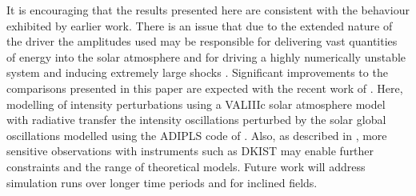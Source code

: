 \documentclass[physics,article,submit,pdftex,moreauthors]{Definitions/mdpi}
\begin{document}
It is encouraging that the results presented here are consistent with the behaviour exhibited  by earlier work. There is an issue that due to the extended nature of the driver the amplitudes used may be responsible for delivering vast quantities of energy into the solar atmosphere and for driving a highly numerically unstable system and inducing extremely large shocks \citet{Santamaria2015}. Significant improvements to the comparisons presented in this paper are expected with the  recent work of \citet{Kostogryz2021}. Here, modelling of intensity perturbations using a VALIIIc solar atmosphere model with radiative transfer the intensity oscillations perturbed by the solar global oscillations modelled using the ADIPLS code of \citet{Christensen-Dalsgaard2008}. Also, as described in \citet{Rast2016}, more sensitive observations with instruments such as DKIST may enable further constraints and the range of theoretical models. Future work will address simulation runs over longer time periods and for inclined fields. 





\end{document}
